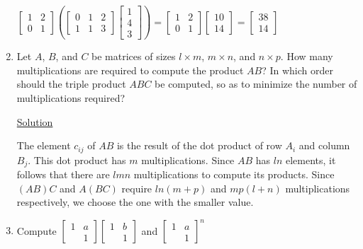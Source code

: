 \begin{enumerate}
$\begin{bmatrix}
1 & 2\\
0 & 1
\end{bmatrix} \left(\begin{bmatrix}
0 & 1 & 2\\
1 & 1 & 3
\end{bmatrix} \begin{bmatrix}
1\\
4\\
3
\end{bmatrix}\right) = \begin{bmatrix}
1 & 2\\
0 & 1
\end{bmatrix} \begin{bmatrix}
10\\
14
\end{bmatrix} = \begin{bmatrix}
38\\
14
\end{bmatrix}$

\item Let $A$, $B$, and $C$ be matrices of sizes $l \times m$, $m \times n$, 
and $n \times p$. How many multiplications are required to compute the product
$AB$? In which order should the triple product $ABC$ be computed, so as to
minimize the number of multiplications required?

\underline{Solution}

The element $c_{ij}$ of $AB$ is the result of the dot product of row $A_i$
and column $B_j$. This dot product has $m$ multiplications. Since $AB$ has
$ln$ elements, it follows that there are $lmn$ multiplications to compute its
products. Since $(AB)C$ and $A(BC)$ require $ln(m+p)$ and $mp(l+n)$ 
multiplications respectively, we choose the one with the smaller value.

\item Compute $\begin{bmatrix}
1 & a\\
  & 1
\end{bmatrix} \begin{bmatrix}
1 & b\\
  & 1
\end{bmatrix}$ and $\begin{bmatrix}
1 & a\\
  & 1
\end{bmatrix}^n$


\end{enumerate}
